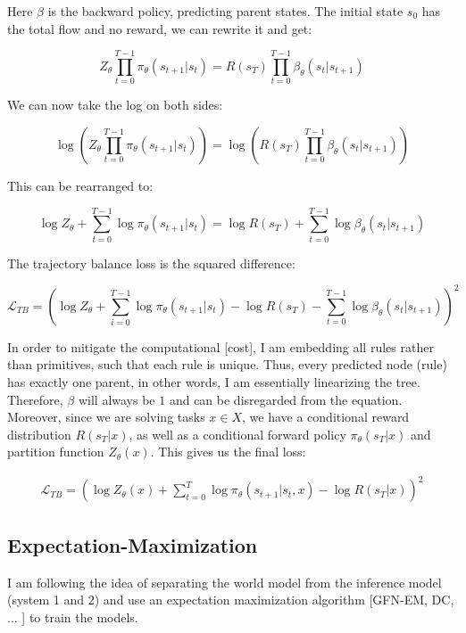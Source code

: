 Here \( \beta \) is the backward policy, predicting parent states. 
The initial state \(s_0\) has the total flow and no reward, we can rewrite it and get:

\begin{equation}
    Z_{\theta} \prod_{t=0}^{T-1} \pi_\theta(s_{t+1} | s_{t}) = R(s_T) \prod_{t=0}^{T-1} \beta_\theta(s_{t} | s_{t+1})
\end{equation}

We can now take the log on both sides:

\begin{equation}
    \log \left(Z_{\theta} \prod_{t=0}^{T-1} \pi_\theta(s_{t+1} | s_{t})\right) = \log \left(R(s_T) \prod_{t=0}^{T-1} \beta_\theta(s_{t} | s_{t+1})\right)
\end{equation}


This can be rearranged to:

\begin{equation}
    \log Z_\theta + \sum_{t=0}^{T-1} \log \pi_\theta(s_{t+1}|s_{t}) = \log R(s_T) + \sum_{t=0}^{T-1} \log \beta_\theta(s_{t}|s_{t+1})
\end{equation}

The trajectory balance loss is the squared difference:

\begin{equation}
    \mathcal{L}_{TB} = \left(\log Z_\theta + \sum_{i=0}^{T-1} \log \pi_\theta(s_{t+1}|s_{t}) - \log R(s_T) - \sum_{t=0}^{T-1} \log \beta_\theta(s_{t}|s_{t+1})\right)^2
\end{equation}


In order to mitigate the computational [cost], I am embedding all rules rather than primitives, such that each rule is unique. Thus, every predicted node (rule) has exactly one parent, in other words, I am essentially linearizing the tree. Therefore, $\beta$ will always be $1$ and can be disregarded from the equation. 
Moreover, since we are solving tasks \( x \in X \), we have a conditional reward distribution $R(s_T|x)$, as well as a conditional forward policy $\pi_\theta(s_T|x)$ and partition function $Z_\theta(x)$.
This gives us the final loss:

\begin{align}
     \mathcal{L}_{TB} = \left(\log Z_\theta(x) + \sum_{t=0}^{T} \log \pi_\theta(s_{t+1}|s_{t}, x) - \log R(s_T \vert x)\right)^2
\end{align}     




\subsection{Expectation-Maximization}
I am following the idea of separating the world model from the inference model (system 1 and 2) and use an expectation maximization algorithm [GFN-EM, DC, ... ] to train the models.

